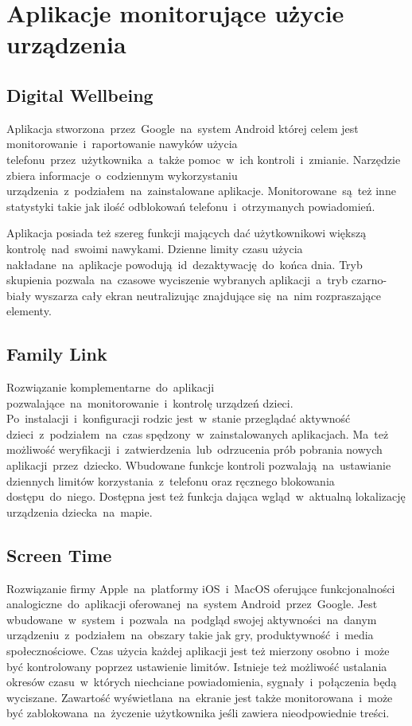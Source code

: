 \section{Aplikacje monitorujące użycie urządzenia}

\subsection{Digital Wellbeing}
\label{sec:digital_wellbeing}
Aplikacja stworzona~przez~Google~na~system Android której celem jest monitorowanie~i~raportowanie nawyków użycia telefonu~przez~użytkownika~a~także pomoc~w~ich kontroli~i~zmianie. Narzędzie zbiera informacje~o~codziennym wykorzystaniu urządzenia~z~podziałem~na~zainstalowane aplikacje. Monitorowane~są~też inne statystyki takie jak ilość odblokowań telefonu~i~otrzymanych powiadomień. 
\bigskip
{}

Aplikacja posiada też szereg funkcji mających dać użytkownikowi większą kontrolę~nad~swoimi nawykami. Dzienne limity czasu użycia nakładane~na~aplikacje powodują~id~dezaktywację~do~końca dnia. Tryb skupienia pozwala~na~czasowe wyciszenie wybranych aplikacji~a~tryb czarno-biały wyszarza cały ekran neutralizując znajdujące się~na~nim rozpraszające elementy.

\subsection{Family Link}
Rozwiązanie komplementarne~do~aplikacji  pozwalające~na~monitorowanie~i~kontrolę urządzeń dzieci. Po~instalacji~i~konfiguracji rodzic jest~w~stanie przeglądać aktywność dzieci~z~podziałem~na~czas spędzony~w~zainstalowanych aplikacjach. Ma~też możliwość weryfikacji~i~zatwierdzenia~lub~odrzucenia prób pobrania nowych aplikacji~przez~dziecko. Wbudowane funkcje kontroli pozwalają~na~ustawianie dziennych limitów korzystania~z~telefonu oraz ręcznego blokowania dostępu~do~niego. Dostępna jest też funkcja dająca wgląd~w~aktualną lokalizację urządzenia dziecka~na~mapie.

\subsection{Screen Time}
Rozwiązanie firmy Apple~na~platformy iOS~i~MacOS oferujące funkcjonalności analogiczne~do~aplikacji  oferowanej~na~system Android~przez~Google. Jest wbudowane~w~system~i~pozwala~na~podgląd swojej aktywności~na~danym urządzeniu~z~podziałem~na~obszary takie jak gry, produktywność~i~media społecznościowe. Czas użycia każdej aplikacji jest też mierzony osobno~i~może być kontrolowany poprzez ustawienie limitów. Istnieje też możliwość ustalania okresów czasu~w~których niechciane powiadomienia, sygnały~i~połączenia będą wyciszane. Zawartość wyświetlana~na~ekranie jest także monitorowana~i~może być zablokowana~na~życzenie użytkownika jeśli zawiera nieodpowiednie treści.

